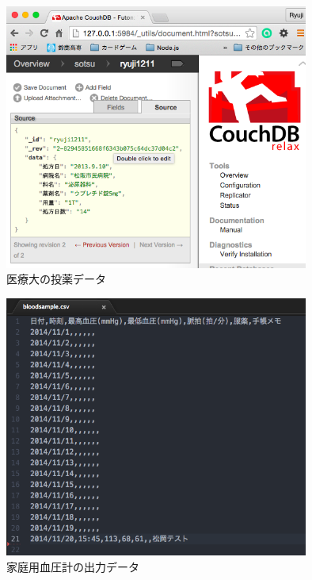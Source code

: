 			\begin{figure}[htbp]
				\begin{center}
					\includegraphics[width=10cm, bb=0 0 576 573]{./gazou/touyaku-data2.png}
				\end{center}
				\caption{医療大の投薬データ}
				\label{iryoudai-touyaku-data}
			\end{figure}

			\begin{figure}[htbp]
				\begin{center}
					\includegraphics[width=10cm, bb=0 0 578 469]{./gazou/blood-data.png}
				\end{center}
				\caption{家庭用血圧計の出力データ}
				\label{blood-data}
			\end{figure}

